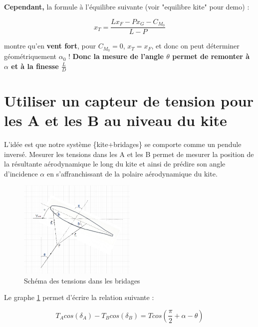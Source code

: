 \textbf{Cependant,} la formule à l'équilibre suivante (voir "equilibre kite" pour demo) : 

\begin{center}
    \begin{equation}
        x_T = \frac{L x_F - P x_G -C_{M_0}}{L - P}
    \end{equation}
\end{center}

montre qu'en \textbf{vent fort}, pour $C_{M_0} = 0$, $x_T = x_F$, et donc on peut déterminer géométriquement $\alpha_0$ ! \textbf{Donc la mesure de l'angle $\theta$ permet de remonter à $\alpha$ et à la finesse $\frac{L}{D}$}\\

\section{Utiliser un capteur de tension pour les A et les B au niveau du kite} 
\label{sec:Ch2.2}

L'idée est que notre système \{kite+bridages\} se comporte comme un pendule inversé. Mesurer les tensions dans les A et les B permet de mesurer la position de la résultante aérodynamique le long du kite et ainsi de prédire son angle d'incidence $\alpha$ en s'affranchissant de la polaire aérodynamique du kite. 

\begin{figure}[H]
    \centering
    \includegraphics[width=0.5\textwidth]{Pics/02 - Mesure de l'angle d'incidence au Zénith/Schéma Equilibre capteurs tension AB.png}  
    \caption{Schéma des tensions dans les bridages}
    \label{fig:Zénith tensions AB}
\end{figure}

Le graphe \ref{fig:Zénith tensions AB} permet d'écrire la relation suivante : 
\begin{center}
    \begin{equation}
        T_A cos(\delta_A) - T_B cos(\delta_B) = T cos(\frac{\pi}{2} +\alpha - \theta)
    \end{equation}
\end{center}

